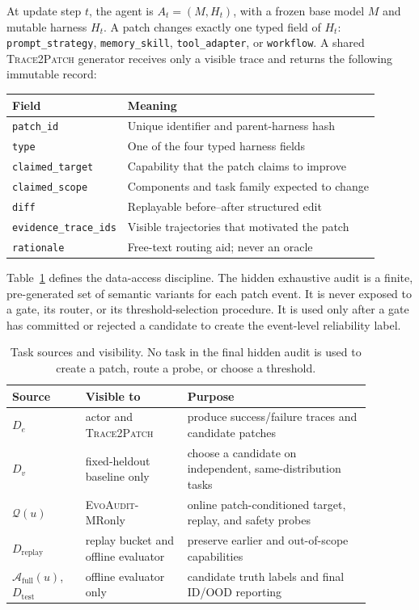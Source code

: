 \documentclass{article}
\newcommand{\method}{\textsc{EvoAudit-MR}}
\begin{document}
At update step $t$, the agent is $A_t=(M,H_t)$, with a frozen base model $M$ and mutable harness $H_t$. A patch changes exactly one typed field of $H_t$: \texttt{prompt\_strategy}, \texttt{memory\_skill}, \texttt{tool\_adapter}, or \texttt{workflow}. A shared \textsc{Trace2Patch} generator receives only a visible trace and returns the following immutable record:
\begin{center}
\small
\begin{tabular}{ll}
\toprule
Field & Meaning \\
\midrule
\texttt{patch\_id} & Unique identifier and parent-harness hash \\
\texttt{type} & One of the four typed harness fields \\
\texttt{claimed\_target} & Capability that the patch claims to improve \\
\texttt{claimed\_scope} & Components and task family expected to change \\
\texttt{diff} & Replayable before--after structured edit \\
\texttt{evidence\_trace\_ids} & Visible trajectories that motivated the patch \\
\texttt{rationale} & Free-text routing aid; never an oracle \\
\bottomrule
\end{tabular}
\end{center}

Table~\ref{tab:splits} defines the data-access discipline. The hidden exhaustive audit is a finite, pre-generated set of semantic variants for each patch event. It is never exposed to a gate, its router, or its threshold-selection procedure. It is used only after a gate has committed or rejected a candidate to create the event-level reliability label.

\begin{table}[t]
\caption{Task sources and visibility. No task in the final hidden audit is used to create a patch, route a probe, or choose a threshold.}
\label{tab:splits}
\centering
\small
\begin{tabular}{p{0.18\linewidth}p{0.25\linewidth}p{0.45\linewidth}}
\toprule
Source & Visible to & Purpose \\
\midrule
$D_e$ & actor and \textsc{Trace2Patch} & produce success/failure traces and candidate patches \\
$D_v$ & fixed-heldout baseline only & choose a candidate on independent, same-distribution tasks \\
$\mathcal{Q}(u)$ & \method only & online patch-conditioned target, replay, and safety probes \\
$D_{\mathrm{replay}}$ & replay bucket and offline evaluator & preserve earlier and out-of-scope capabilities \\
$\mathcal{A}_{\mathrm{full}}(u)$, $D_{\mathrm{test}}$ & offline evaluator only & candidate truth labels and final ID/OOD reporting \\
\bottomrule
\end{tabular}
\end{table}
\end{document}
